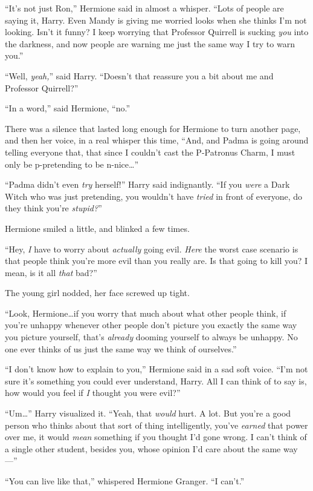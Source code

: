 “It’s not just Ron,” Hermione said in almost a whisper. “Lots of people are saying it, Harry. Even Mandy is giving me worried looks when she thinks I’m not looking. Isn’t it funny? I keep worrying that Professor Quirrell is sucking \emph{you} into the darkness, and now people are warning me just the same way I try to warn you.”

“Well, \emph{yeah,}” said Harry. “Doesn’t that reassure you a bit about me and Professor Quirrell?”

“In a word,” said Hermione, “no.”

There was a silence that lasted long enough for Hermione to turn another page, and then her voice, in a real whisper this time, “And, and Padma is going around telling everyone that, that since I couldn’t cast the P-Patronus Charm, I must only be p-pretending to be n-nice…”

“Padma didn’t even \emph{try} herself!” Harry said indignantly. “If you \emph{were} a Dark Witch who was just pretending, you wouldn’t have \emph{tried} in front of everyone, do they think you’re \emph{stupid?}”

Hermione smiled a little, and blinked a few times.

“Hey, \emph{I} have to worry about \emph{actually} going evil. \emph{Here} the worst case scenario is that people think you’re more evil than you really are. Is that going to kill you? I mean, is it all \emph{that} bad?”

The young girl nodded, her face screwed up tight.

“Look, Hermione…if you worry that much about what other people think, if you’re unhappy whenever other people don’t picture you exactly the same way you picture yourself, that’s \emph{already} dooming yourself to always be unhappy. No one ever thinks of us just the same way we think of ourselves.”

“I don’t know how to explain to you,” Hermione said in a sad soft voice. “I’m not sure it’s something you could ever understand, Harry. All I can think of to say is, how would you feel if \emph{I} thought you were evil?”

“Um…” Harry visualized it. “Yeah, that \emph{would} hurt. A lot. But you’re a good person who thinks about that sort of thing intelligently, you’ve \emph{earned} that power over me, it would \emph{mean} something if you thought I’d gone wrong. I can’t think of a single other student, besides you, whose opinion I’d care about the same way—”

“You can live like that,” whispered Hermione Granger. “I can’t.”

